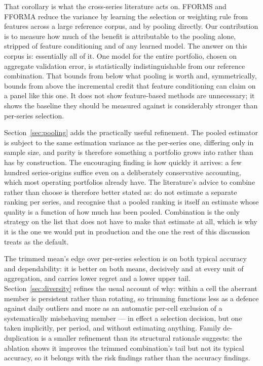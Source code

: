 \documentclass[11pt]{article}
\begin{document}
That corollary is what the cross-series literature acts on. FFORMS and FFORMA \citep{talagala2023,montero2020} reduce the variance by learning the selection or weighting rule from features across a large reference corpus, and \citet{kourentzes2019} by pooling directly. Our contribution is to measure how much of the benefit is attributable to the pooling alone, stripped of feature conditioning and of any learned model. The answer on this corpus is: essentially all of it. One model for the entire portfolio, chosen on aggregate validation error, is statistically indistinguishable from our reference combination. That bounds from below what pooling is worth and, symmetrically, bounds from above the incremental credit that feature conditioning can claim on a panel like this one. It does not show feature-based methods are unnecessary; it shows the baseline they should be measured against is considerably stronger than per-series selection.

Section~\ref{sec:pooling} adds the practically useful refinement. The pooled estimator is subject to the same estimation variance as the per-series one, differing only in sample size, and parity is therefore something a portfolio grows into rather than has by construction. The encouraging finding is how quickly it arrives: a few hundred series-origins suffice even on a deliberately conservative accounting, which most operating portfolios already have. The literature's advice to combine rather than choose is therefore better stated as: do not estimate a separate ranking per series, and recognise that a pooled ranking is itself an estimate whose quality is a function of how much has been pooled. Combination is the only strategy on the list that does not have to make that estimate at all, which is why it is the one we would put in production and the one the rest of this discussion treats as the default.

The trimmed mean's edge over per-series selection is on both typical accuracy and dependability: it is better on both means, decisively and at every unit of aggregation, and carries lower regret and a lower upper tail. Section~\ref{sec:diversity} refines the usual account of why: within a cell the aberrant member is persistent rather than rotating, so trimming functions less as a defence against daily outliers and more as an automatic per-cell exclusion of a systematically misbehaving member --- in effect a selection decision, but one taken implicitly, per period, and without estimating anything. Family de-duplication is a smaller refinement than its structural rationale suggests: the ablation shows it improves the trimmed combination's tail but not its typical accuracy, so it belongs with the risk findings rather than the accuracy findings.
\end{document}
